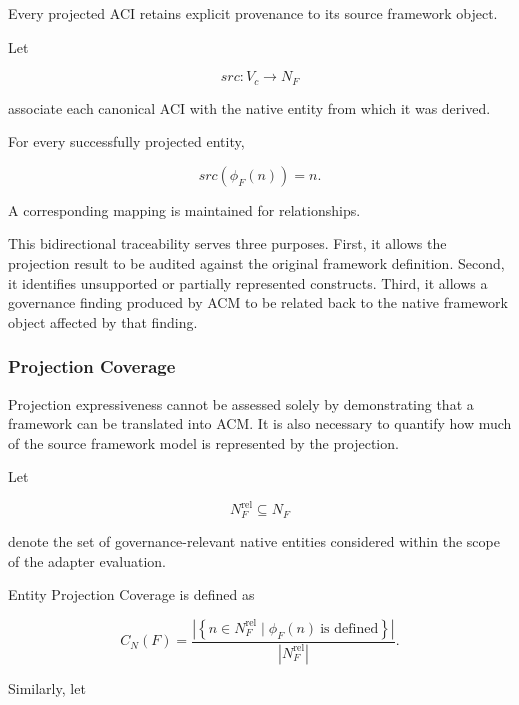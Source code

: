 \documentclass[10pt]{article}
\begin{document}
Every projected ACI retains explicit provenance to its source framework object.

Let

\begin{equation}
	src :
	V_c
	\rightarrow
	N_F
\end{equation}

associate each canonical ACI with the native entity from which it was derived.

For every successfully projected entity,

\begin{equation}
	src(\phi_F(n))=n.
\end{equation}

A corresponding mapping is maintained for relationships.

This bidirectional traceability serves three purposes. First, it allows the
projection result to be audited against the original framework definition.
Second, it identifies unsupported or partially represented constructs. Third,
it allows a governance finding produced by ACM to be related back to the native
framework object affected by that finding.

\subsubsection{Projection Coverage}

Projection expressiveness cannot be assessed solely by demonstrating that a
framework can be translated into ACM. It is also necessary to quantify how much
of the source framework model is represented by the projection.

Let

\begin{equation}
	N_F^{\mathrm{rel}}
	\subseteq
	N_F
\end{equation}

denote the set of governance-relevant native entities considered within the
scope of the adapter evaluation.

Entity Projection Coverage is defined as

\begin{equation}
	C_N(F)
	=
	\frac{
		\left|
		\left\{
		n\in N_F^{\mathrm{rel}}
		\mid
		\phi_F(n)\ \text{is defined}
		\right\}
		\right|
	}{
		|N_F^{\mathrm{rel}}|
	}.
\end{equation}

Similarly, let
\end{document}
